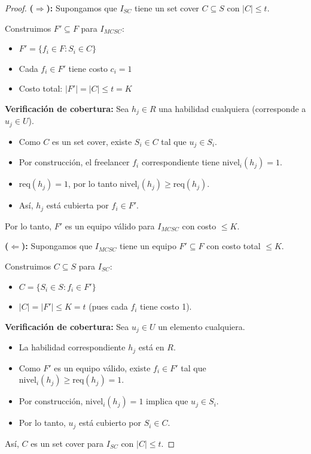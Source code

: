 \documentclass[11pt]{article}
\begin{document}
	\begin{proof}
		\noindent\textbf{($\Rightarrow$):} Supongamos que $I_{SC}$ tiene un set cover $C \subseteq S$ con $|C| \leq t$.
		
		Construimos $F' \subseteq F$ para $I_{MCSC}$:
		\begin{itemize}
			\item $F' = \{f_i \in F : S_i \in C\}$
			\item Cada $f_i \in F'$ tiene costo $c_i = 1$
			\item Costo total: $|F'| = |C| \leq t = K$
		\end{itemize}
		
		\textbf{Verificación de cobertura:}
		Sea $h_j \in R$ una habilidad cualquiera (corresponde a $u_j \in U$).
		\begin{itemize}
			\item Como $C$ es un set cover, existe $S_i \in C$ tal que $u_j \in S_i$.
			\item Por construcción, el freelancer $f_i$ correspondiente tiene $\text{nivel}_i(h_j) = 1$.
			\item $\text{req}(h_j) = 1$, por lo tanto $\text{nivel}_i(h_j) \geq \text{req}(h_j)$.
			\item Así, $h_j$ está cubierta por $f_i \in F'$.
		\end{itemize}
		
		Por lo tanto, $F'$ es un equipo válido para $I_{MCSC}$ con costo $\leq K$.
		
		\vspace{0.3cm}
		
		\noindent\textbf{($\Leftarrow$):} Supongamos que $I_{MCSC}$ tiene un equipo $F' \subseteq F$ con costo total $\leq K$.
		
		Construimos $C \subseteq S$ para $I_{SC}$:
		\begin{itemize}
			\item $C = \{S_i \in S : f_i \in F'\}$
			\item $|C| = |F'| \leq K = t$ (pues cada $f_i$ tiene costo 1).
		\end{itemize}
		
		\textbf{Verificación de cobertura:}
		Sea $u_j \in U$ un elemento cualquiera.
		\begin{itemize}
			\item La habilidad correspondiente $h_j$ está en $R$.
			\item Como $F'$ es un equipo válido, existe $f_i \in F'$ tal que $\text{nivel}_i(h_j) \geq \text{req}(h_j) = 1$.
			\item Por construcción, $\text{nivel}_i(h_j) = 1$ implica que $u_j \in S_i$.
			\item Por lo tanto, $u_j$ está cubierto por $S_i \in C$.
		\end{itemize}
		
		Así, $C$ es un set cover para $I_{SC}$ con $|C| \leq t$.
	\end{proof}
\end{document}
